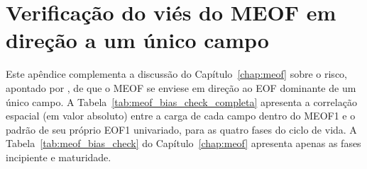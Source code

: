 \chapter{Verificação do viés do MEOF em direção a um único campo}\label{apendice:meof_bias}

Este apêndice complementa a discussão do Capítulo~\ref{chap:meof} sobre o risco, apontado por \citet{bretherton1992intercomparison}, de que o MEOF se enviese em direção ao EOF dominante de um único campo. A Tabela~\ref{tab:meof_bias_check_completa} apresenta a correlação espacial (em valor absoluto) entre a carga de cada campo dentro do MEOF1 e o padrão de seu próprio EOF1 univariado, para as quatro fases do ciclo de vida. A Tabela~\ref{tab:meof_bias_check} do Capítulo~\ref{chap:meof} apresenta apenas as fases incipiente e maturidade.


